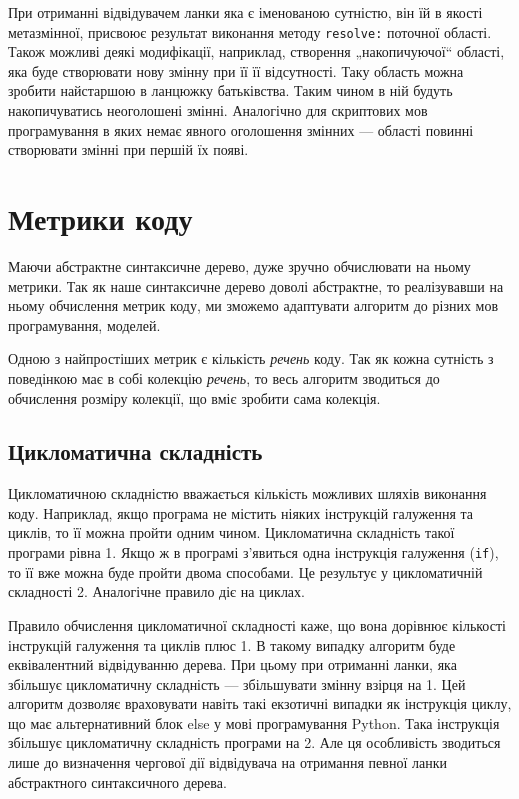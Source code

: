 \documentclass[12pt,a4paper]{article}
\begin{document}
При отриманні відвідувачем ланки яка є іменованою сутністю, він їй в якості метазмінної, присвоює результат виконання методу \lstinline$resolve:$ поточної області. Також можливі деякі модифікації, наприклад, створення „накопичуючої“ області, яка буде створювати нову змінну при її її відсутності. Таку область можна зробити найстаршою в ланцюжку батьківства. Таким чином в ній будуть накопичуватись неоголошені змінні. Аналогічно для скриптових мов програмування в яких немає явного оголошення змінних --- області повинні створювати змінні при першій їх появі.
\clearpage

\section{Метрики коду}
Маючи абстрактне синтаксичне дерево, дуже зручно обчислювати на ньому метрики. Так як наше синтаксичне дерево доволі абстрактне, то реалізувавши на ньому обчислення метрик коду, ми зможемо адаптувати алгоритм до різних мов програмування, моделей. 

Одною з найпростіших метрик є кількість \emph{речень} коду. Так як кожна сутність з поведінкою має в собі колекцію \emph{речень}, то весь алгоритм зводиться до обчислення розміру колекції, що вміє зробити сама колекція.

\subsection{Цикломатична складність}
Цикломатичною складністю вважається кількість можливих шляхів виконання коду. Наприклад, якщо програма не містить ніяких інструкцій галуження та циклів, то її можна пройти одним чином. Цикломатична складність такої програми рівна 1. Якщо ж в програмі з'явиться одна інструкція галуження (\lstinline$if$), то її вже можна буде пройти двома способами. Це результує у цикломатичній складності 2. Аналогічне правило діє на циклах. 

Правило обчислення цикломатичної складності каже, що вона дорівнює кількості інструкцій галуження та циклів плюс 1. В такому випадку алгоритм буде еквівалентний відвідуванню дерева. При цьому при отриманні ланки, яка збільшує цикломатичну складність --- збільшувати змінну взірця на 1. Цей алгоритм дозволяє враховувати навіть такі екзотичні випадки як інструкція циклу, що має альтернативний блок else у мові програмування Python. Така інструкція збільшує цикломатичну складність програми на 2. Але ця особливість зводиться лише до визначення чергової дії відвідувача на отримання певної ланки абстрактного синтаксичного дерева.
\end{document}
